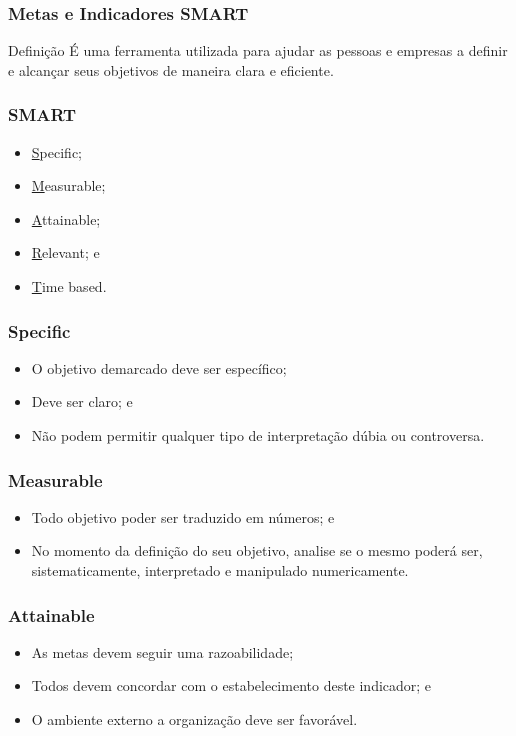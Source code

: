 \documentclass[aspectratio=169]{beamer}
\begin{document}
\begin{frame}
	\frametitle{Metas e Indicadores SMART}

	\begin{block}{Defini\c cão}
		É uma ferramenta utilizada para ajudar as pessoas e empresas a definir e alcançar seus objetivos de maneira clara e eficiente.
	\end{block}
\end{frame}

\begin{frame}
	\frametitle{SMART}

	\begin{itemize}
		\item \underline{S}pecific;
		\item \underline{M}easurable;
		\item \underline{A}ttainable;
		\item \underline{R}elevant; e
		\item \underline{T}ime based.
	\end{itemize}
\end{frame}

\begin{frame}
	\frametitle{Specific}

	\begin{itemize}
		\item O objetivo demarcado deve ser específico;
		\item Deve ser claro; e
		\item Não podem permitir qualquer tipo de interpretação dúbia ou controversa.
	\end{itemize}
\end{frame}

\begin{frame}
	\frametitle{Measurable}

	\begin{itemize}
		\item Todo objetivo poder ser traduzido em números; e
		\item No momento da definição do seu objetivo, analise se o mesmo poderá ser, sistematicamente, interpretado e manipulado numericamente.
	\end{itemize}
\end{frame}

\begin{frame}
	\frametitle{Attainable}

	\begin{itemize}
		\item As metas devem seguir uma razoabilidade;
		\item Todos devem concordar com o estabelecimento deste indicador; e
		\item O ambiente externo a organiza\c cão deve ser favorável.
	\end{itemize}
\end{frame}
\end{document}
